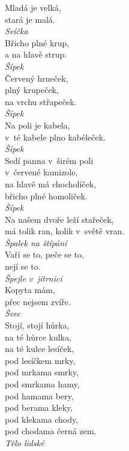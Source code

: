 \begin{multicols}{3}
\noindent
Mladá je velká,\\
stará je malá.\\[1 mm]
{\sl Svíčka}\\

\noindent
Břicho plné krup,\\
a na hlavě strup.\\[1 mm]
{\sl Šípek}\\

\noindent
Červený hrneček,\\
plný krupeček,\\
na vrchu střapeček.\\[1 mm]
{\sl Šípek}\\

\noindent
Na poli je kabela,\\
v~té kabele plno kabéleček.\\[1 mm]
{\sl Šípek}\\

\noindent
Sedí panna v~širém poli\\
v~červené kamizole,\\
na hlavě má chocholíček,\\
břicho plné homoliček.\\[1 mm]
{\sl Šípek}\\

\noindent
Na našem dvoře leží stařeček,\\
má tolik ran, kolik v~světě vran.\\[1 mm]
{\sl Špalek na štípání}\\

\noindent
Vaří se to, peče se to,\\
nejí se to.\\[1 mm]
{\sl Špejle v~jitrnici}\\

\noindent
Kopyta mám,\\
přec nejsem zvíře.\\[1 mm]
{\sl Švec}\\

\noindent
Stojí, stojí hůrka,\\
na té hůrce kulka,\\
na té kulce lesíček,\\
pod lesíčkem mrky,\\
pod mrkama smrky,\\
pod smrkama hamy,\\
pod hamama bery,\\
pod berama kleky,\\
pod klekama chody,\\
pod chodama černá zem.\\[1 mm]
{\sl Tělo lidské}\\


\end{multicols}
